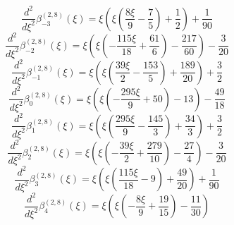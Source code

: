 \begin{equation}
\frac{d^{2}}{d\xi^{2}}\beta_{-3}^{(2,8)} (\xi) =
 \xi \left(\xi \left(\frac{8 \xi}{9} - \frac{7}{5}\right) + \frac{1}{2}\right) + \frac{1}{90}
\end{equation}
\begin{equation}
\frac{d^{2}}{d\xi^{2}}\beta_{-2}^{(2,8)} (\xi) =
 \xi \left(\xi \left(- \frac{115 \xi}{18} + \frac{61}{6}\right) - \frac{217}{60}\right) - \frac{3}{20}
\end{equation}
\begin{equation}
\frac{d^{2}}{d\xi^{2}}\beta_{-1}^{(2,8)} (\xi) =
 \xi \left(\xi \left(\frac{39 \xi}{2} - \frac{153}{5}\right) + \frac{189}{20}\right) + \frac{3}{2}
\end{equation}
\begin{equation}
\frac{d^{2}}{d\xi^{2}}\beta_{0}^{(2,8)} (\xi) =
 \xi \left(\xi \left(- \frac{295 \xi}{9} + 50\right) - 13\right) - \frac{49}{18}
\end{equation}
\begin{equation}
\frac{d^{2}}{d\xi^{2}}\beta_{1}^{(2,8)} (\xi) =
 \xi \left(\xi \left(\frac{295 \xi}{9} - \frac{145}{3}\right) + \frac{34}{3}\right) + \frac{3}{2}
\end{equation}
\begin{equation}
\frac{d^{2}}{d\xi^{2}}\beta_{2}^{(2,8)} (\xi) =
 \xi \left(\xi \left(- \frac{39 \xi}{2} + \frac{279}{10}\right) - \frac{27}{4}\right) - \frac{3}{20}
\end{equation}
\begin{equation}
\frac{d^{2}}{d\xi^{2}}\beta_{3}^{(2,8)} (\xi) =
 \xi \left(\xi \left(\frac{115 \xi}{18} - 9\right) + \frac{49}{20}\right) + \frac{1}{90}
\end{equation}
\begin{equation}
\frac{d^{2}}{d\xi^{2}}\beta_{4}^{(2,8)} (\xi) =
 \xi \left(\xi \left(- \frac{8 \xi}{9} + \frac{19}{15}\right) - \frac{11}{30}\right)
\end{equation}

